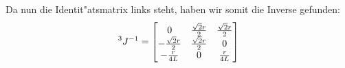 \documentclass[11pt]{article}
\begin{document}
    Da nun die Identit"atsmatrix links steht, haben wir somit die Inverse gefunden:
    \begin{equation}
        \prescript{3}{}{J}^{-1} =
        \begin{bmatrix}
            0 & \frac{\sqrt{2}r}{2} & \frac{\sqrt{2}r}{2} \\
            -\frac{\sqrt{2}r}{2}         & \frac{\sqrt{2}r}{2} & 0 \\
            -\frac{r}{4L}         & 0 & \frac{r}{4L}
        \end{bmatrix}\label{eq:finallydone}
    \end{equation}
\end{document}
